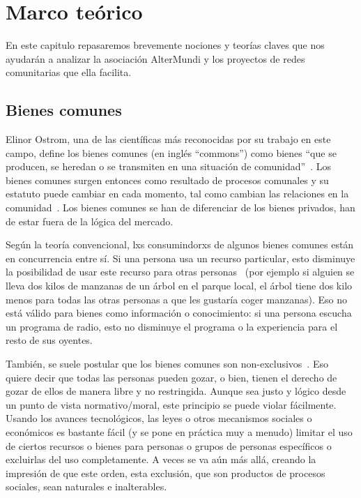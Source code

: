 \section{Marco teórico}

En este capitulo repasaremos brevemente nociones y teorías claves que nos ayudarán a analizar la asociación AlterMundi y los proyectos de redes comunitarias que ella facilita.

\subsection{Bienes comunes}

Elinor Ostrom, una de las científicas más reconocidas por su trabajo en este campo, define los bienes comunes (en inglés ``commons'') como bienes ``que se producen, se heredan o se transmiten en una situación de comunidad''~\autocite{Ostrom1990}.
Los bienes comunes surgen entonces como resultado de procesos comunales y su estatuto puede cambiar en cada momento, tal como cambian las relaciones en la comunidad~\autocite{Harvey2012}.
Los bienes comunes se han de diferenciar de los bienes privados, han de estar fuera de la lógica del mercado.

Según la teoría convencional, lxs consumindorxs de algunos bienes comunes están en concurrencia entre sí.
Si una persona usa un recurso particular, esto disminuye la posibilidad de usar este recurso para otras personas~\autocite[85]{Helfrich2012}
(por ejemplo si alguien se lleva dos kilos de manzanas de un árbol en el parque local, el árbol tiene dos kilo menos para todas las otras personas a que les gustaría coger manzanas).
Eso no está válido para bienes como información o conocimiento: si una persona escucha un programa de radio, esto no disminuye el programa o la experiencia para el resto de sus oyentes.

También, se suele postular que los bienes comunes son non-exclusivos~\autocite[86]{Helfrich2012}.
Eso quiere decir que todas las personas pueden gozar, o bien, tienen el derecho de gozar de ellos de manera libre y no restringida.
Aunque sea justo y lógico desde un punto de vista normativo/moral, este principio se puede violar fácilmente.
Usando los avances tecnológicos, las leyes o otros mecanismos sociales o económicos es bastante fácil (y se pone en práctica muy a menudo) limitar el uso de ciertos recursos o bienes para personas o grupos de personas específicos o excluirlas del uso completamente.
A veces se va aún más allá, creando la impresión de que este orden, esta exclusión, que son productos de procesos sociales, sean naturales e inalterables.

